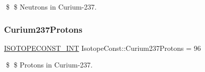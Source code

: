 \$ \$ Neutrons in Curium-\/237. \mbox{\label{group___isotope_const-_curium-_cm237_gaf8851a03235527d67776b7da3ddc1daf}} 
\subsubsection{\texorpdfstring{Curium237\+Protons}{Curium237Protons}}
{\footnotesize\ttfamily \mbox{\hyperlink{group___isotope_const-_macros_ga5f18360b3e99483a35c32d789e62621c}{I\+S\+O\+T\+O\+P\+E\+C\+O\+N\+S\+T\+\_\+\+I\+NT}} Isotope\+Const\+::\+Curium237\+Protons = 96}

\$ \$ Protons in Curium-\/237. 
